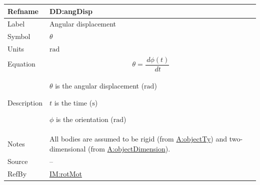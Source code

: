 \documentclass[12pt]{article}
\begin{document}
\medskip
\noindent
\begin{minipage}{\textwidth}
\begin{tabular}{>{\raggedright}p{}>{\raggedright\arraybackslash}p{}}
\toprule \textbf{Refname} & \textbf{DD:angDisp}
\label{DD:angDisp}
\\ \midrule
Label & Angular displacement
        
\\ \midrule
Symbol & $θ$
         
\\ \midrule
Units & ${\text{rad}}$
        
\\ \midrule
Equation & \begin{displaymath}
           θ=\frac{\,dϕ\left(t\right)}{\,dt}
           \end{displaymath}
\\ \midrule
Description & \begin{symbDescription}
              \item{$θ$ is the angular displacement (${\text{rad}}$)}
              \item{$t$ is the time (${\text{s}}$)}
              \item{$ϕ$ is the orientation (${\text{rad}}$)}
              \end{symbDescription}
\\ \midrule
Notes & All bodies are assumed to be rigid (from \hyperref[assumpOT]{A:objectTy}) and two-dimensional (from \hyperref[assumpOD]{A:objectDimension}).
        
\\ \midrule
Source & --
         
\\ \midrule
RefBy & \hyperref[IM:rotMot]{IM:rotMot}
        
\\ \bottomrule
\end{tabular}
\end{minipage}
\end{document}
